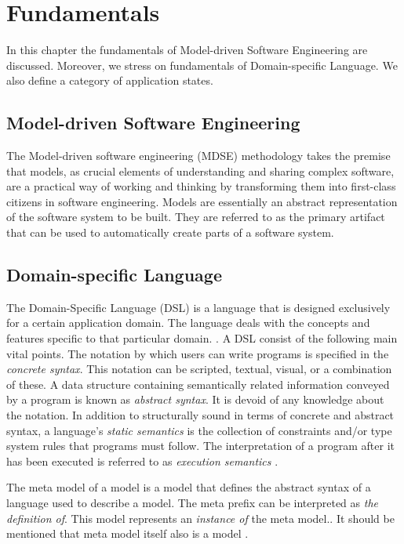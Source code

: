 \chapter{Fundamentals}
\label{ch:fundamentals}
In this chapter the fundamentals of Model-driven Software Engineering are discussed. Moreover, we stress on fundamentals of Domain-specific Language. We also define a category of application states.

\section{Model-driven Software Engineering}
The Model-driven software engineering (MDSE) methodology takes the premise that models, as crucial elements of understanding and sharing complex software, are a practical way of working and thinking by transforming them into first-class citizens in software engineering\cite{mdse}. Models are essentially an abstract representation of the software system to be built. They are referred to as the primary artifact that can be used to automatically create parts of a software system. \cite{mdse2011}

\section{Domain-specific Language}
The Domain-Specific Language (DSL) is a language that is designed exclusively for a certain application domain. The language deals with the concepts and features specific to that particular domain. \cite{dsl}.
A DSL consist of the following main vital points. The notation by which users can write programs is specified in the \textit{concrete syntax}. This notation can be scripted, textual, visual, or a combination of these. A data structure containing semantically related information conveyed by a program is known as \textit{abstract syntax}. It is devoid of any knowledge about the notation. In addition to structurally sound in terms of concrete and abstract syntax, a language's \textit{static semantics} is the collection of constraints and/or type system rules that programs must follow. The interpretation of a program after it has been executed is referred to as \textit{execution semantics} \cite{dsl-eng}.

The meta model of a model is a model that defines the abstract syntax of a language used to describe a model. The meta prefix can be interpreted as \textit{the definition of}. This model represents an \textit{instance of} the meta model.. It should be mentioned that meta model itself also is a model \cite{dsl-eng}.



